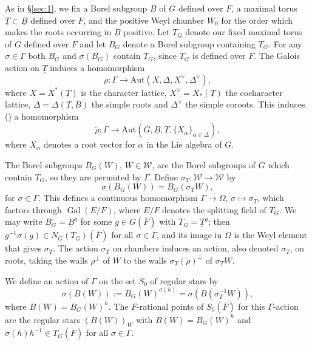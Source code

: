 \documentclass[12pt,letterpaper]{amsart}
\theoremstyle{plain}
\theoremstyle{definition}
\theoremstyle{remark}
\theoremstyle{definition}
\DeclareMathOperator{\Gal}{Gal}
\begin{document}
As in \S\ref{sec:1}, we fix a Borel subgroup $\underline{B}$ of $G$
defined over ${F}$, a maximal torus
$\underline{T}\subset\underline{B}$ defined over $F$,
and the positive Weyl chamber $W_0$ for the order
which makes the roots occurring in $\underline{B}$
positive. Let $T_G$ denote our fixed maximal torus of $G$ defined over $F$
and let $B_G$ denote a Borel subgroup containing
$T_G$. For any $\sigma\in\Gamma$ both $B_G$ and
$\sigma(B_G)$ contain $T_G$, since $T_G$ is defined over $F$.
The Galois action on $\underline{T}$ induces a homomorphism
\begin{equation}\tag{2.1a}\label{eq:2.1a}
\rho:\Gamma\rightarrow \mathrm{Aut}(X,\Delta,X^{\vee},\Delta^{\vee}),
\end{equation}
where $X=X^*(\underline{T})$ is the character lattice,
$X^{\vee}=X_*(\underline{T})$ the cocharacter lattice,
$\Delta=\Delta(\underline{T},\underline{B})$ the simple roots
and $\Delta^{\vee}$ the simple coroots.
This induces (\cite{Sp79}) a homomorphism
\begin{equation}\tag{2.1b}\label{eq:2.1b}
\tilde{\rho}:\Gamma\rightarrow
\mathrm{Aut}(G,\underline B,\underline T,\{X_{\alpha}\}_{\alpha\in\Delta}),
\end{equation}
where $X_\alpha$ denotes a root vector for $\alpha$
in the Lie algebra of $G$.

The Borel subgroups ${B}_G(W)$, $W\in {\mathcal W}$, are the Borel
subgroups of $G$ which contain ${T}_G$, so they are permuted by
$\Gamma$. Define $\sigma_T:{\mathcal W}\rightarrow {\mathcal W}$ by
\[
\sigma ({B}_G(W))={B}_G(\sigma_T W),
\]
for $\sigma\in\Gamma$. This defines a continuous homomorphism
$\Gamma\rightarrow \Omega$,
$\sigma\longmapsto \sigma_T$, which factors through $\Gal(E/F)$,
where $E/F$ denotes the splitting field of $T_G$.
We may write $B_G=\underline{B}^g$
for some $g\in G(\overline{F})$ with $T_G=\underline T^g$; then
$g^{-1}\sigma(g)\in N_G(T_G)(\overline{F})$ for all $\sigma\in \Gamma$, and its
image in $\Omega$ is the Weyl element that gives $\sigma_T$.
The action $\sigma_T$ on chambers induces an action,
also denoted $\sigma_T$, on roots, taking
the walls $\rho^\perp$ of $W$ to the walls
$\sigma_T(\rho)^\perp$ of $\sigma_TW$.

We define an action of $\Gamma$ on the set $S_0$ of regular stars by
\begin{equation}\tag{2.2}\label{eq:2.2}
\sigma (B(W)):={B}_G(W)^{\sigma (h)}
=\sigma({B}(\sigma_T^{-1}W)),
\end{equation}
where $B(W)=B_G(W)^h$.
The $F$-rational points of $S_0(\overline{F})$
for this $\Gamma$-action are the
regular stars $(B(W))_{W}$ with
$B(W)=B_G(W)^h$ and $\sigma(h)h^{-1}\in T_G(\overline{F})$
for all $\sigma\in\Gamma$.
\end{document}
